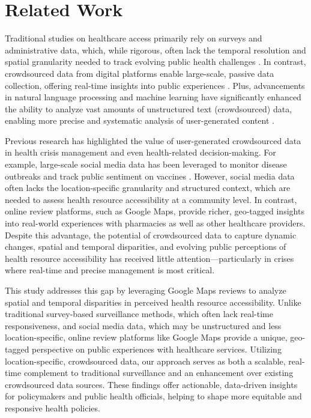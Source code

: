 \section{Related Work}
Traditional studies on healthcare access primarily rely on surveys and administrative data, which, while rigorous, often lack the temporal resolution and spatial granularity needed to track evolving public health challenges \cite{gao2016assessment}. In contrast, crowdsourced data from digital platforms enable large-scale, passive data collection, offering real-time insights into public experiences \cite{wazny2017crowdsourcing}. Plus, advancements in natural language processing and machine learning have significantly enhanced the ability to analyze vast amounts of unstructured text (crowdsourced) data, enabling more precise and systematic analysis of user-generated content \cite{khan2023exploring,devlin2018bert}.

Previous research has highlighted the value of user-generated crowdsourced data in health crisis management and even health-related decision-making. For example, large-scale social media data has been leveraged to monitor disease outbreaks \cite{gui2017managing} and track public sentiment on vaccines \cite{salathe2011vaccine,broniatowski2018weaponized}. However, social media data often lacks the location-specific granularity and structured context, which are needed to assess health resource accessibility at a community level. In contrast, online review platforms, such as Google Maps, provide richer, geo-tagged insights into real-world experiences with pharmacies as well as other healthcare providers. Despite this advantage, the potential of crowdsourced data to capture dynamic changes, spatial and temporal disparities, and evolving public perceptions of health resource accessibility has received little attention—particularly in crises where real-time and precise management is most critical.

This study addresses this gap by leveraging Google Maps reviews to analyze spatial and temporal disparities in perceived health resource accessibility. Unlike traditional survey-based surveillance methods, which often lack real-time responsiveness, and social media data, which may be unstructured and less location-specific, online review platforms like Google Maps provide a unique, geo-tagged perspective on public experiences with healthcare services. Utilizing location-specific, crowdsourced data, our approach serves as both a scalable, real-time complement to traditional surveillance and an enhancement over existing crowdsourced data sources. These findings offer actionable, data-driven insights for policymakers and public health officials, helping to shape more equitable and responsive health policies.